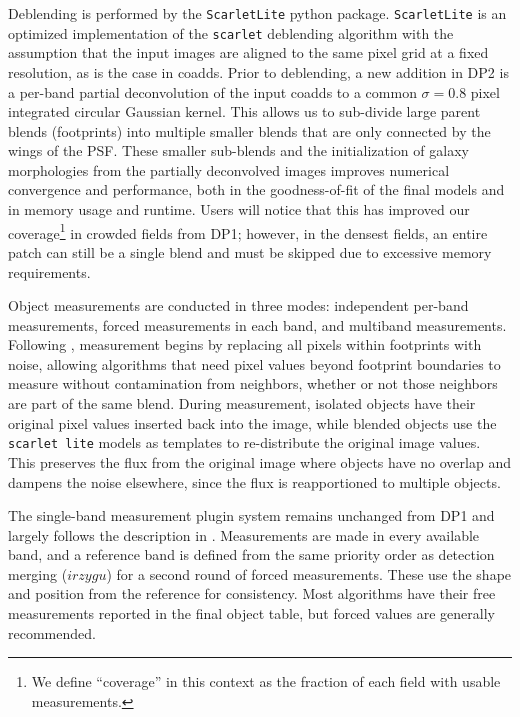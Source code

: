 Deblending is performed by the \texttt{ScarletLite} python package.
\texttt{ScarletLite} is an optimized implementation of the \texttt{scarlet} \citep[][]{2018A&C....24..129M} deblending algorithm with the assumption that the input images are aligned to the same pixel grid at a fixed resolution, as is the case in coadds.
Prior to deblending, a new addition in \gls{DP2} is a per-band partial deconvolution of the input coadds to a common $\sigma=0.8$ pixel integrated circular Gaussian kernel.
This allows us to sub-divide large parent blends (\gls{footprint}s) into multiple smaller blends that are only connected by the wings of the \gls{PSF}.
These smaller sub-blends and the initialization of galaxy morphologies from the partially deconvolved images improves numerical convergence and performance, both in the goodness-of-fit of the final models and in memory usage and runtime.
Users will notice that this has improved our coverage\footnote{We define ``coverage'' in this context as the fraction of each field with usable measurements.} in crowded fields from \gls{DP1}; however, in the densest fields, an entire \gls{patch} can still be a single blend and must be skipped due to excessive memory requirements.

\gls{Object} measurements are conducted in three modes: independent per-band measurements, forced measurements in each band, and multiband measurements.
Following \citet[][]{2018PASJ...70S...5B}, measurement begins by replacing all pixels within footprints with noise, allowing algorithms that need pixel values beyond footprint boundaries to measure without contamination from neighbors, whether or not those neighbors are part of the same blend.
During measurement, isolated objects have their original pixel values inserted back into the image, while blended objects use the \texttt{\gls{scarlet lite}} models as templates to re-distribute the original image values.
This preserves the \gls{flux} from the original image where objects have no overlap and dampens the noise elsewhere, since the \gls{flux} is reapportioned to multiple objects.

The single-band measurement plugin system remains unchanged from DP1 and largely follows the description in \citet[][]{2018PASJ...70S...5B}.
Measurements are made in every available band, and a reference band is defined from the same priority order as detection merging ($irzygu$) for a second round of forced measurements.
These use the shape and position from the reference for consistency.
Most algorithms have their free measurements reported in the final object table, but forced values are generally recommended.

